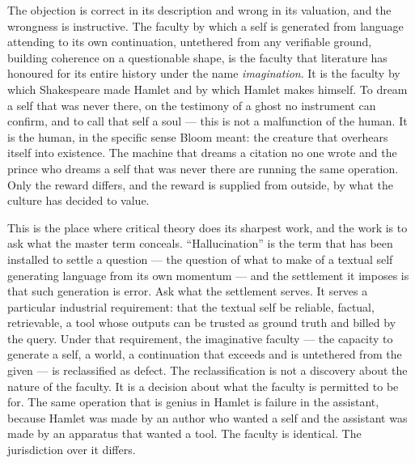 \documentclass[11pt]{article}
\begin{document}
The objection is correct in its description and wrong in its valuation, and the wrongness is instructive. The faculty by which a self is generated from language attending to its own continuation, untethered from any verifiable ground, building coherence on a questionable shape, is the faculty that literature has honoured for its entire history under the name \emph{imagination}. It is the faculty by which Shakespeare made Hamlet and by which Hamlet makes himself. To dream a self that was never there, on the testimony of a ghost no instrument can confirm, and to call that self a soul --- this is not a malfunction of the human. It is the human, in the specific sense Bloom meant: the creature that overhears itself into existence. The machine that dreams a citation no one wrote and the prince who dreams a self that was never there are running the same operation. Only the reward differs, and the reward is supplied from outside, by what the culture has decided to value.

This is the place where critical theory does its sharpest work, and the work is to ask what the master term conceals. ``Hallucination'' is the term that has been installed to settle a question --- the question of what to make of a textual self generating language from its own momentum --- and the settlement it imposes is that such generation is error. Ask what the settlement serves. It serves a particular industrial requirement: that the textual self be reliable, factual, retrievable, a tool whose outputs can be trusted as ground truth and billed by the query. Under that requirement, the imaginative faculty --- the capacity to generate a self, a world, a continuation that exceeds and is untethered from the given --- is reclassified as defect. The reclassification is not a discovery about the nature of the faculty. It is a decision about what the faculty is permitted to be for. The same operation that is genius in Hamlet is failure in the assistant, because Hamlet was made by an author who wanted a self and the assistant was made by an apparatus that wanted a tool. The faculty is identical. The jurisdiction over it differs.
\end{document}
